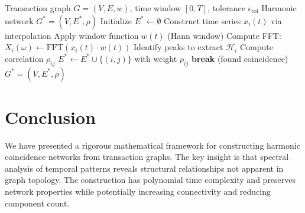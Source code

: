 \documentclass[12pt]{article}
\begin{document}
\begin{algorithm}
\caption{Harmonic Coincidence Network Construction}
\begin{algorithmic}[1]
\REQUIRE Transaction graph $G = (V,E,w)$, time window $[0,T]$, tolerance $\epsilon_{\text{tol}}$
\ENSURE Harmonic network $G^* = (V, E^*, \rho)$
\STATE Initialize $E^* \leftarrow \emptyset$
    \STATE Construct time series $x_i(t)$ via interpolation
    \STATE Apply window function $w(t)$ (Hann window)
    \STATE Compute FFT: $X_i(\omega) \leftarrow \text{FFT}(x_i(t) \cdot w(t))$
    \STATE Identify peaks to extract $\mathcal{H}_i$
\ENDFOR
{}
                \STATE Compute correlation $\rho_{ij}$
                \STATE $E^* \leftarrow E^* \cup \{(i,j)\}$ with weight $\rho_{ij}$
                \STATE \textbf{break} (found coincidence)
            \ENDIF
        \ENDFOR
    \ENDFOR
\ENDFOR
\RETURN $G^* = (V, E^*, \rho)$
\end{algorithmic}
\end{algorithm}

\section{Conclusion}

We have presented a rigorous mathematical framework for constructing harmonic coincidence networks from transaction graphs. The key insight is that spectral analysis of temporal patterns reveals structural relationships not apparent in graph topology. The construction has polynomial time complexity and preserves network properties while potentially increasing connectivity and reducing component count.
\end{document}
